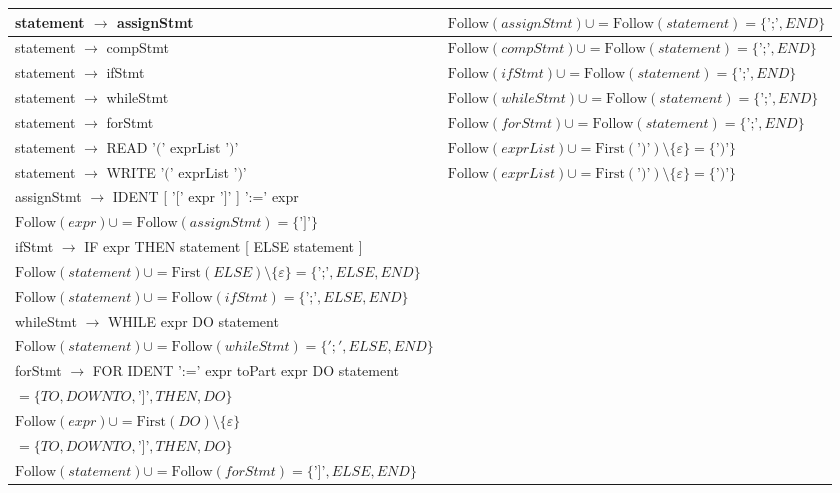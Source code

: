 \documentclass[8pt]{scrartcl}
\newcommand{\First}[1]{\mathrm{First}(#1)}
\newcommand{\Follow}[1]{\mathrm{Follow}(#1)}
\newcommand{\epsset}{\{\varepsilon\}}
\begin{document}
\begin{itemize}
\begin{tabular}{|l|l|}
                \hline 
                statement $\rightarrow$ assignStmt & $\Follow{assignStmt} \cup = \Follow{statement} = \{\text{';'}, END\}$\\
                \hline
                statement $\rightarrow$ compStmt & $\Follow{compStmt} \cup = \Follow{statement} = \{\text{';'}, END\}$\\
                \hline
                statement $\rightarrow$ ifStmt & $\Follow{ifStmt} \cup = \Follow{statement} = \{\text{';'}, END\}$\\
                \hline
                statement $\rightarrow$ whileStmt & $\Follow{whileStmt} \cup = \Follow{statement} = \{\text{';'}, END\}$\\
                \hline
                statement $\rightarrow$ forStmt & $\Follow{forStmt} \cup = \Follow{statement} = \{\text{';'}, END\}$\\
                \hline
                statement $\rightarrow$ READ '$($' exprList '$)$' & $\Follow{exprList} \cup = \First{\text{'$)$'}} \setminus \epsset = \{\text{'$)$'}\}$\\
                \hline
                statement $\rightarrow$ WRITE '$($' exprList '$)$' & $\Follow{exprList} \cup = \First{\text{'$)$'}} \setminus \epsset = \{\text{'$)$'}\}$\\
                \hline
                assignStmt $\rightarrow$ IDENT [ '$[$' expr '$]$' ] ':=' expr & \makecell[l]{$\Follow{expr} \cup = \First{\text{'$]$'}} \setminus \epsset = \{\text{'$]$'}\}$\\ $\Follow{expr} \cup = \Follow{assignStmt} = \{\text{'$]$'}\}$}\\
                \hline
                ifStmt $\rightarrow$ IF expr THEN statement [ ELSE statement ] & \makecell[l]{$\Follow{expr} \cup = \First{THEN} \setminus \epsset = \{\text{'$]$'}, THEN\}$\\ $\Follow{statement} \cup = \First{ELSE} \setminus \epsset = \{\text{';'}, ELSE, END\}$\\ $\Follow{statement} \cup = \Follow{ifStmt} = \{\text{';'}, ELSE, END\}$}\\
                \hline
                whileStmt $\rightarrow$ WHILE expr DO statement & \makecell[l]{$\Follow{expr} \cup = \First{DO} = \{\text{']'}, THEN, DO\}$\\ $\Follow{statement} \cup = \Follow{whileStmt} = \{';', ELSE, END\}$}\\
                \hline
                forStmt $\rightarrow$ FOR IDENT ':=' expr toPart expr DO statement & \makecell[l]{$\Follow{expr} \cup = \First{toPart} \setminus \epsset $\\ $= \{TO, DOWNTO, \text{']'}, THEN, DO\}$\\$\Follow{expr} \cup = \First{DO} \setminus \epsset $\\ $= \{TO, DOWNTO, \text{']'}, THEN, DO\}$\\ $\Follow{statement} \cup = \Follow{forStmt} = \{\text{'$]$'}, ELSE, END\}$}\\

\end{tabular}
\end{itemize}
\end{document}
